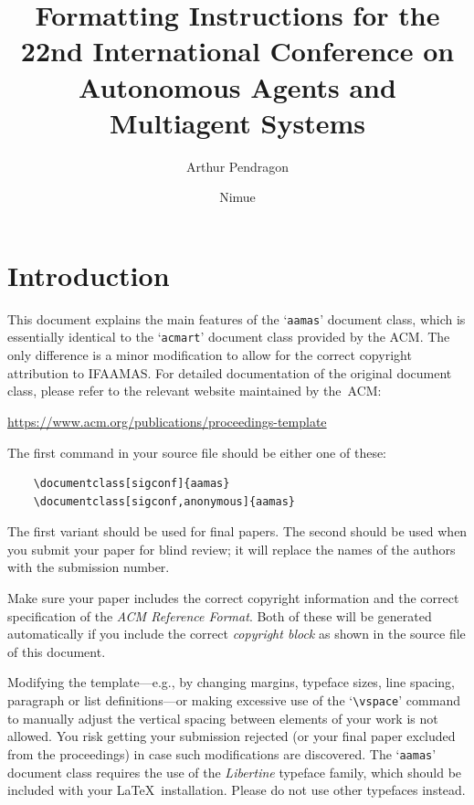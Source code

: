 \documentclass[sigconf]{aamas}
\title[AAMAS-2023 Formatting Instructions]{Formatting Instructions for the 22nd International Conference on Autonomous Agents and Multiagent Systems}
\author{Arthur Pendragon}
\affiliation{
  \institution{Camelot Castle}
  \city{Camelot}
  \country{United Kingdom}}
\author{Nimue}
\affiliation{
  \institution{The Lady's Lake}
  \city{Avalon}
  \country{United Kingdom}}
\begin{document}

\pagestyle{fancy}
\fancyhead{}


\maketitle 


\section{Introduction}

This document explains the main features of the `\texttt{aamas}' 
document class, which is essentially identical to the `\texttt{acmart}'
document class provided by the ACM. The only difference is a minor 
modification to allow for the correct copyright attribution to IFAAMAS.
For detailed documentation of the original document class, please refer
to the relevant website maintained by the~ACM:
%
\begin{center}
\url{https://www.acm.org/publications/proceedings-template}
\end{center}
%
The first command in your source file should be either one of these:
\begin{verbatim}
    \documentclass[sigconf]{aamas}
    \documentclass[sigconf,anonymous]{aamas}
\end{verbatim}
%
The first variant should be used for final papers. The second should be
used when you submit your paper for blind review; it will replace the 
names of the authors with the submission number.

Make sure your paper includes the correct copyright information and 
the correct specification of the \emph{ACM Reference Format}. Both of 
these will be generated automatically if you include the correct 
\emph{copyright block} as shown in the source file of this document.

Modifying the template---e.g., by changing margins, typeface sizes, 
line spacing, paragraph or list definitions---or making excessive use 
of the `\verb|\vspace|' command to manually adjust the vertical spacing 
between elements of your work is not allowed. You risk getting your 
submission rejected (or your final paper excluded from the proceedings) 
in case such modifications are discovered. The `\texttt{aamas}' document 
class requires the use of the \textit{Libertine} typeface family, which 
should be included with your \LaTeX\ installation. Please do not use 
other typefaces instead.
\end{document}
